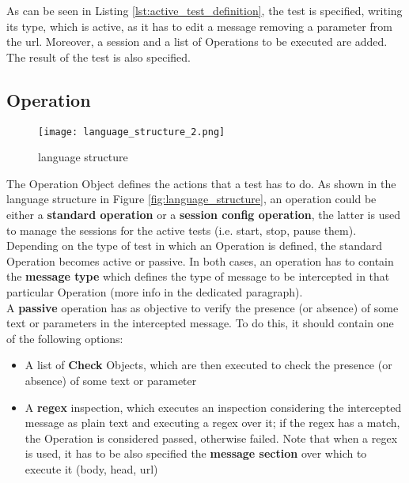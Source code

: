 As can be seen in Listing \ref{lst:active_test_definition}, the test is specified, writing its type, which is active, as it has to edit a message removing a parameter from the url. Moreover, a session and a list of Operations to be executed are added. The result of the test is also specified.

\subsection{Operation}
\label{sec:operation}
\begin{wrapfigure}{r}{0.4\textwidth}
    \texttt{[image: language\_structure\_2.png]}
    \caption{language structure}
    \label{fig:language_structure_2}
\end{wrapfigure}

The Operation Object defines the actions that a test has to do. As shown in the language structure in Figure \ref{fig:language_structure}, an operation could be either a \textbf{standard operation} or a \textbf{session config operation}, the latter is used to manage the sessions for the active tests (i.e. start, stop, pause them). Depending on the type of test in which an Operation is defined, the standard Operation becomes active or passive.
In both cases, an operation has to contain the \textbf{message type} which defines the type of message to be intercepted in that particular Operation (more info in the dedicated paragraph).
\\A \textbf{passive} operation has as objective to verify the presence (or absence) of some text or parameters in the intercepted message. To do this, it should contain one of the following options:
\begin{itemize}
    \item A list of \textbf{Check} Objects, which are then executed to check the presence (or absence) of some text or parameter
    \item A \textbf{regex} inspection, which executes an inspection considering the intercepted message as plain text and executing a regex over it; if the regex has a match, the Operation is considered passed, otherwise failed. Note that when a regex is used, it has to be also specified the \textbf{message section} over which to execute it (body, head, url)
\end{itemize}

